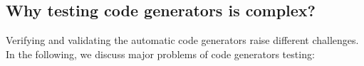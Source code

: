 \subsection{Why testing code generators is complex?}
\label{sec:Why testing code generators is complex?}
Verifying and validating the automatic code generators raise different challenges.
In the following, we discuss major problems of code generators testing:
